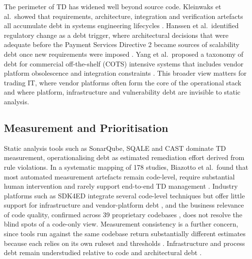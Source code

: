 \documentclass[
  journal,
]{IEEEtran}%
\begin{document}
The perimeter of TD has widened well beyond source code. Kleinwaks et
al.~showed that requirements, architecture, integration and verification
artefacts all accumulate debt in systems engineering lifecycles
. Hanssen et
al.~identified regulatory change as a debt trigger, where architectural
decisions that were adequate before the Payment Services Directive 2
became sources of scalability debt once new requirements were imposed
. Yang et
al.~proposed a taxonomy of debt for commercial off-the-shelf (COTS)
intensive systems that includes vendor platform obsolescence and
integration constraints
. This broader
view matters for trading IT, where vendor platforms often form the core
of the operational stack and where platform, infrastructure and
vulnerability debt are invisible to static analysis.

\subsection{Measurement and
Prioritisation}\label{measurement-and-prioritisation}

Static analysis tools such as SonarQube, SQALE and CAST dominate TD
measurement, operationalising debt as estimated remediation effort
derived from rule violations. In a systematic mapping of 178 studies,
Biazotto et al.~found that most automated measurement artefacts remain
code-level, require substantial human intervention and rarely support
end-to-end TD management
. Industry
platforms such as SDK4ED integrate several code-level techniques but
offer little support for infrastructure and vendor-platform debt
, and the
business relevance of code quality, confirmed across 39 proprietary
codebases , does not
resolve the blind spots of a code-only view. Measurement consistency is
a further concern, since tools run against the same codebase return
substantially different estimates because each relies on its own ruleset
and thresholds
.
Infrastructure and process debt remain understudied relative to code and
architectural debt
.
\end{document}
